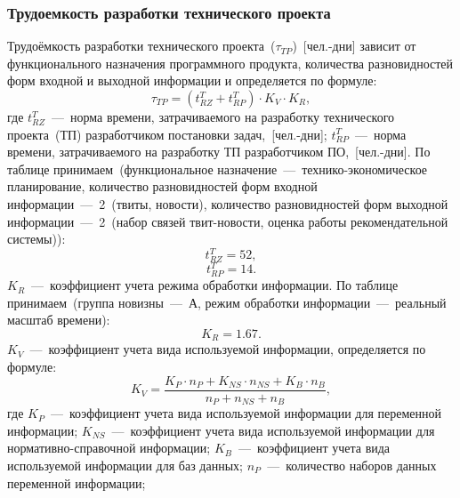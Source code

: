         \subsubsection{Трудоемкость разработки технического проекта}
            Трудоёмкость разработки технического проекта~($\tau_{TP}$)~[чел.-дни] зависит от функционального назначения программного продукта, количества разновидностей форм входной и выходной информации и определяется по формуле:
            \begin{equation}
                \tau_{TP} = (t^T_{RZ} + t^T_{RP}) \cdot K_V \cdot K_R,
            \end{equation}
            где $t^T_{RZ}$~---~норма времени, затрачиваемого на разработку технического проекта~(ТП) разработчиком постановки задач,~[чел.-дни];
            $t^T_{RP}$~---~норма времени, затрачиваемого на разработку ТП разработчиком ПО,~[чел.-дни].
            По таблице принимаем~(функциональное назначение~---~технико-экономическое планирование,
            количество разновидностей форм входной информации~---~2~(твиты, новости),
            количество разновидностей форм выходной информации~---~2~(набор связей твит-новости, оценка работы рекомендательной системы)):
            \begin{equation*}
                t^T_{RZ} = 52,
            \end{equation*}
            \begin{equation*}
                t^T_{RP} = 14.
            \end{equation*}
            $K_R$~---~коэффициент учета режима обработки информации. По таблице принимаем~(группа новизны~---~А, режим обработки информации~---~реальный масштаб времени):
            \begin{equation*}
                K_R = 1.67.
            \end{equation*}
            $K_V$~---~коэффициент учета вида используемой информации, определяется по формуле:
            \begin{equation}
                K_V = \dfrac {K_P \cdot n_P + K_{NS} \cdot n_{NS} + K_B \cdot n_B} {n_P + n_{NS} + n_B },
            \end{equation}
            где $K_P$~---~коэффициент учета вида используемой информации для переменной информации;
            $K_{NS}$~---~коэффициент учета вида используемой информации для нормативно-справочной информации;
            $K_B$~---~коэффициент учета вида используемой информации для баз данных;
            $n_P$~---~количество наборов данных переменной информации;
